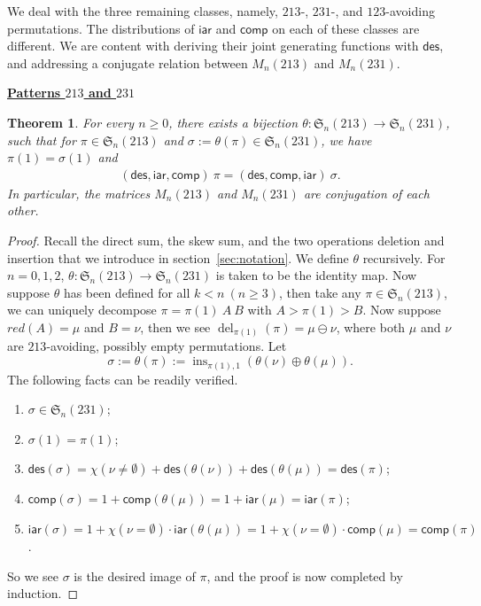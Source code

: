 \documentclass[12pt]{amsart}
\numberwithin{equation}{section}
\theoremstyle{plain}
\newtheorem{theorem}{Theorem}[section]
\theoremstyle{definition}
\def\des{\mathsf{des}}
\def\S{\mathfrak{S}}
\def\iar{\mathsf{iar}}
\def\comp{\mathsf{comp}}
\def\del{\operatorname{del}}
\def\ins{\operatorname{ins}}
\begin{document}
We deal with the three remaining classes, namely, $213$-, $231$-, and $123$-avoiding permutations. The distributions of $\iar$ and $\comp$ on each of these classes are different. We are content with deriving their joint generating functions with $\des$, and addressing a conjugate relation between $M_n(213)$ and $M_n(231)$.
\medskip

\noindent \underline{\bf Patterns $213$ and $231$}
\medskip

\begin{theorem}\label{thm:213-231-conjugate}
For every $n\ge 0$, there exists a bijection $\theta:\S_n(213)\rightarrow\S_n(231)$, such that for $\pi\in\S_n(213)$ and $\sigma:=\theta(\pi)\in\S_n(231)$, we have $\pi(1)=\sigma(1)$ and 
\begin{align*}
(\des,\iar,\comp)\:\pi = (\des,\comp,\iar)\:\sigma.
\end{align*}
In particular, the matrices $M_n(213)$ and $M_n(231)$ are conjugation of each other.
\end{theorem}
\begin{proof}
Recall the direct sum, the skew sum, and the two operations deletion and insertion that we introduce in section~\ref{sec:notation}. We define $\theta$ recursively. For $n=0,1,2$, $\theta:\S_n(213)\rightarrow\S_n(231)$ is taken to be the identity map. Now suppose $\theta$ has been defined for all $k < n~(n\ge 3)$, then take any $\pi\in\S_n(213)$, we can uniquely decompose $\pi=\pi(1)\:A\:B$ with $A>\pi(1)>B$. Now suppose $red(A)=\mu$ and $B=\nu$, then we see $\del_{\pi(1)}(\pi)=\mu\ominus\nu$, where both $\mu$ and $\nu$ are $213$-avoiding, possibly empty permutations. Let
$$\sigma:=\theta(\pi):=\ins_{\pi(1),1}(\theta(\nu)\oplus\theta(\mu)).$$
The following facts can be readily verified.
\begin{enumerate}
	\item $\sigma\in\S_n(231)$;
	\item $\sigma(1)=\pi(1)$;
	\item $\des(\sigma)=\chi(\nu\neq\emptyset)+\des(\theta(\nu))+\des(\theta(\mu))=\des(\pi)$;
	\item $\comp(\sigma)=1+\comp(\theta(\mu))=1+\iar(\mu)=\iar(\pi)$;
	\item $\iar(\sigma)=1+\chi(\nu=\emptyset)\cdot\iar(\theta(\mu))=1+\chi(\nu=\emptyset)\cdot\comp(\mu)=\comp(\pi)$.
\end{enumerate}
So we see $\sigma$ is the desired image of $\pi$, and the proof is now completed by induction.
\end{proof}
\end{document}
